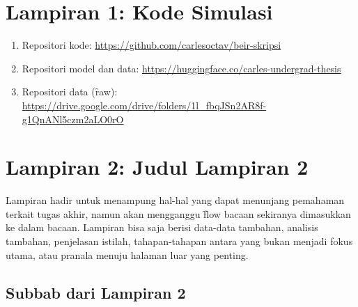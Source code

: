 \chapter*{Lampiran 1: Kode Simulasi}
\begin{enumerate}
    \item Repositori kode: \url{https://github.com/carlesoctav/beir-skripsi} 
    \item Repositori model dan data: \url{https://huggingface.co/carles-undergrad-thesis}
    \item Repositori data (\f{raw}): \url{https://drive.google.com/drive/folders/1l_fbqJSn2AR8f-g1QnANl5czm2aLO0rO}
\end{enumerate}





\chapter*{Lampiran 2: Judul Lampiran 2}
\label{appendix:sample}
Lampiran hadir untuk menampung hal-hal yang dapat menunjang pemahaman terkait tugas akhir, namun akan mengganggu \f{flow} bacaan sekiranya dimasukkan ke dalam bacaan.
Lampiran bisa saja berisi data-data tambahan, analisis tambahan, penjelasan istilah, tahapan-tahapan antara yang bukan menjadi fokus utama, atau pranala menuju halaman luar yang penting.

\section*{Subbab dari Lampiran 2}
\label{appendix:sampleSubchap}
